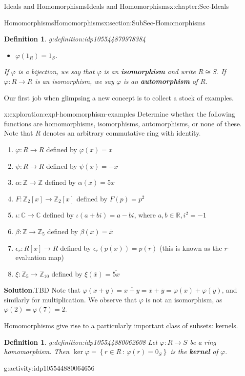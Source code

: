 \documentclass[oneside,10pt,]{book}
\newcommand{\blocktitlefont}{\relax}
\newcommand{\terminology}[1]{\textbf{#1}}
\numberwithin{equation}{section}
\def\p{\varphi}
\newcommand{\setof}[2]{{\left\{#1\,\colon\,#2\right\}}}
\def\C{{\mathbb C}}
\def\Z{{\mathbb Z}}
\def\R{{\mathbb R}}
\newtheorem{definition}[theorem]{Definition}
\begin{document}
\begin{chapterptx}{Ideals and Homomorphisms}{}{Ideals and Homomorphisms}{}{}{x:chapter:Sec-Ideals}
\begin{sectionptx}{Homomorphisms}{}{Homomorphisms}{}{}{x:section:SubSec-Homomorphisms}
\begin{definition}{}{g:definition:idp105544879978384}
\begin{itemize}[label=\textbullet]
\item{}\(\p(1_R) = 1_S\).%
\end{itemize}
If \(\p\) is a bijection, we say that \(\p\) is an \terminology{isomorphism} and write \(R\cong S\). If \(\p : R\to R\) is an isomorphism, we say \(\p\) is an \terminology{automorphism} of \(R\).%
\end{definition}
Our first job when glimpsing a new concept is to collect a stock of examples.%
\begin{exploration}{}{x:exploration:expl-homomorphism-examples}%
Determine whether the following functions are homomorphisms, isomorphisms, automorphisms, or none of these. Note that \(R\) denotes an arbitrary commutative ring with identity.%
%
\begin{enumerate}
\item{}\(\p : R\to R\) defined by \(\p(x)=x\)%
\item{}\(\psi : R\to R\) defined by \(\psi(x)=-x\)%
\item{}\(\alpha : \Z\to \Z\) defined by \(\alpha(x)=5x\)%
\item{}\(F : \Z_2[x]\to \Z_2[x]\) defined by \(F(p) = p^2\)%
\item{}\(\iota : \C\to \C\) defined by \(\iota(a+bi)=a-bi\), where \(a,b\in \R, i^2 = -1\)%
\item{}\(\beta : \Z\to \Z_{5}\) defined by \(\beta(x) = \overline{x}\)%
\item{}\(\epsilon_r : R[x] \to R\) defined by \(\epsilon_r(p(x)) = p(r)\) (this is known as the \(r\)-evaluation map)%
\item{}\(\xi : \Z_5 \to \Z_{10}\) defined by \(\xi(\overline{x}) = \overline{5x}\)%
\end{enumerate}
\par\smallskip%
\noindent\textbf{\blocktitlefont Solution}.\hypertarget{g:solution:idp105544880060688}{}\quad{}TBD Note that \(\p(x+y) = \overline{x+y} = \overline{x} + \overline{y} = \p(x) + \p(y)\), and similarly for multiplication. We observe that \(\p\) is not an isomorphism, as \(\p(2) = \p(7) = \overline{2}\).%
\end{exploration}%
Homomorphisms give rise to a particularly important class of subsets: kernels.%
\begin{definition}{}{g:definition:idp105544880062608}%
Let \(\p : R \to S\) be a ring homomorphism. Then \(\ker \p =\setof{r\in R}{\p(r)=0_S}\) is the \terminology{kernel} of \(\p\).%
\end{definition}
\begin{activity}{}{g:activity:idp105544880064656}%

\end{activity}
\end{sectionptx}
\end{chapterptx}
\end{document}
